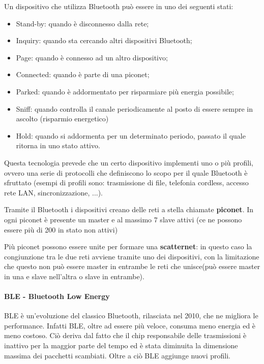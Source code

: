Un dispositivo che utilizza Bluetooth può essere in uno dei seguenti stati:
\begin{itemize}
  \item Stand-by: quando è disconnesso dalla rete;
  \item Inquiry: quando sta cercando altri dispositivi Bluetooth;
  \item Page: quando è connesso ad un altro dispositivo;
  \item Connected: quando è parte di una piconet;
  \item Parked: quando è addormentato per risparmiare più energia possibile;
  \item Sniff: quando controlla il canale periodicamente al posto di essere 
        sempre in ascolto (risparmio energetico)
  \item Hold: quando si addormenta per un determinato periodo, passato il quale 
        ritorna in uno stato attivo.
\end{itemize}

Questa tecnologia prevede che un certo dispositivo implementi uno o più profili, 
ovvero una serie di protocolli che definiscono lo scopo per il quale Bluetooth è 
sfruttato (esempi di profili sono: trasmissione di file, telefonia cordless, 
accesso rete LAN, sincronizzazione, ...).

Tramite il Bluetooth i dispositivi creano delle reti a stella chiamate 
\textbf{piconet}. In ogni piconet è presente un master e al massimo 7 slave 
attivi (ce ne possono essere più di 200 in stato non attivi)

Più piconet possono essere unite per formare una \textbf{scatternet}: in questo 
caso la congiunzione tra le due reti avviene tramite uno dei dispositivi, con la 
limitazione che questo non può essere master in entrambe le reti che unisce(può 
essere master in una e slave nell'altra o slave in entrambe).

\paragraph{BLE - Bluetooth Low Energy}
BLE è un'evoluzione del classico Bluetooth, rilasciata nel 2010, che ne migliora 
le performance. Infatti BLE, oltre ad essere più veloce, consuma meno energia ed 
è meno costoso. Ciò deriva dal fatto che il chip responsabile delle trasmissioni 
è inattivo per la maggior parte del tempo ed è stata diminuita la dimensione 
massima dei pacchetti scambiati. Oltre a ciò BLE aggiunge nuovi profili.

